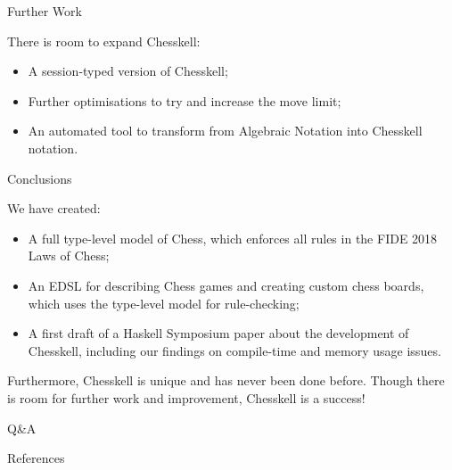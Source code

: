 \documentclass{beamer}
\begin{document}
\begin{frame}{Further Work}

There is room to expand Chesskell:

\pause

\begin{itemize}
    \item<2-> A session-typed version of Chesskell;
    \item<3-> Further optimisations to try and increase the move limit;
    \item<4-> An automated tool to transform from Algebraic Notation into Chesskell notation.
\end{itemize}
    
\end{frame}

\begin{frame}{Conclusions}

We have created:

\pause

\begin{itemize}
    \item<2-> A full type-level model of Chess, which enforces all rules in the FIDE 2018 Laws of Chess;
    \item<3-> An EDSL for describing Chess games and creating custom chess boards, which uses the type-level model for rule-checking;
    \item<4-> A first draft of a Haskell Symposium paper about the development of Chesskell, including our findings on compile-time and memory usage issues.
\end{itemize}

\begin{overprint}
Furthermore, Chesskell is unique and has never been done before. Though there is room for further work and improvement, Chesskell is a success!
\end{overprint}

    
\end{frame}

\begin{frame}[standout]

Q\&A
    
\end{frame}

\begin{frame}[allowframebreaks]{References}

\printbibliography
    
\end{frame}
\end{document}

